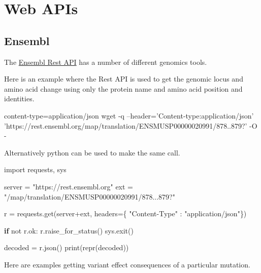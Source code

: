 \documentclass[]{book}
\newenvironment{Shaded}{\begin{snugshade}}{\end{snugshade}}
\newcommand{\ExtensionTok}[1]{#1}
\newcommand{\FunctionTok}[1]{\textcolor[rgb]{0.00,0.00,0.00}{#1}}
\newcommand{\KeywordTok}[1]{\textcolor[rgb]{0.13,0.29,0.53}{\textbf{#1}}}
\newcommand{\NormalTok}[1]{#1}
\newcommand{\StringTok}[1]{\textcolor[rgb]{0.31,0.60,0.02}{#1}}
\begin{document}
\hypertarget{apis}{%
\chapter{Web APIs}\label{apis}}

\hypertarget{ensembl}{%
\section{Ensembl}\label{ensembl}}

The \href{https://rest.ensembl.org/}{Ensembl Rest API} has a number of different genomics tools.

Here is an example where the Rest API is used to get the genomic locus and amino acid change using only the protein name and amino acid position and identities.

\begin{Shaded}
\begin{Highlighting}[]
\ExtensionTok{content-type}\NormalTok{=application/json}
\FunctionTok{wget}\NormalTok{ -q --header=}\StringTok{'Content-type:application/json'} \StringTok{'https://rest.ensembl.org/map/translation/ENSMUSP00000020991/878..879?'}\NormalTok{  -O -}
\end{Highlighting}
\end{Shaded}

Alternatively python can be used to make the same call.

\begin{Shaded}
\begin{Highlighting}[]
\ExtensionTok{import}\NormalTok{ requests, sys}
 
\ExtensionTok{server}\NormalTok{ = }\StringTok{"https://rest.ensembl.org"}
\ExtensionTok{ext}\NormalTok{ = }\StringTok{"/map/translation/ENSMUSP00000020991/878...879?"}
 
\ExtensionTok{r}\NormalTok{ = requests.get(server+ext, headers=\{ }\StringTok{"Content-Type"}\NormalTok{ : }\StringTok{"application/json"}\NormalTok{\})}
 
\KeywordTok{if} \ExtensionTok{not}\NormalTok{ r.ok:}
  \ExtensionTok{r.raise_for_status}\NormalTok{()}
  \ExtensionTok{sys.exit}\NormalTok{()}
 
\ExtensionTok{decoded}\NormalTok{ = r.json()}
\ExtensionTok{print}\NormalTok{(repr(decoded))}
\end{Highlighting}
\end{Shaded}

Here are examples getting variant effect consequences of a particular mutation.
\end{document}
